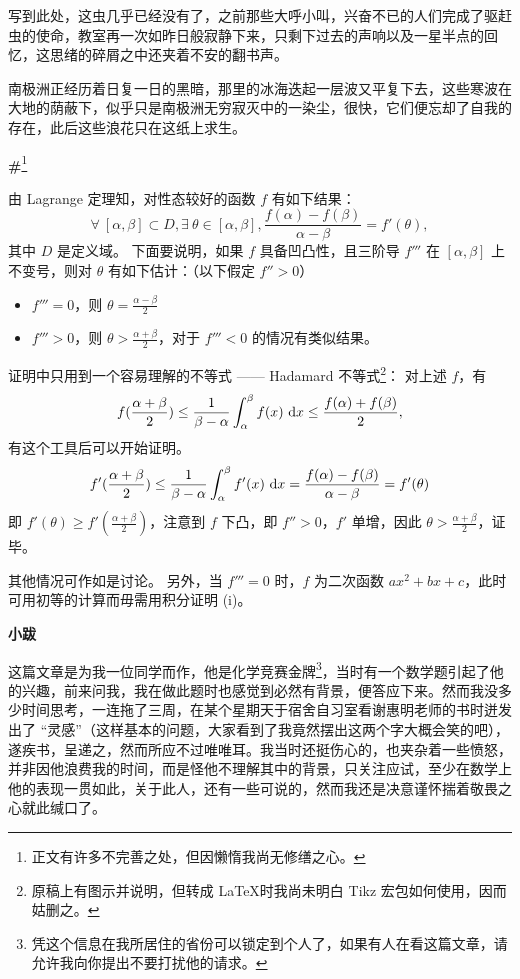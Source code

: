 \documentclass{ctexbook}
\begin{document}
    写到此处，这虫几乎已经没有了，之前那些大呼小叫，兴奋不已的人们完成了驱赶虫的使命，教室再一次如昨日般寂静下来，只剩下过去的声响以及一星半点的回忆，这思绪的碎屑之中还夹着不安的翻书声。

    南极洲正经历着日复一日的黑暗，那里的冰海迭起一层波又平复下去，这些寒波在大地的荫蔽下，似乎只是南极洲无穷寂灭中的一染尘，很快，它们便忘却了自我的存在，此后这些浪花只在这纸上求生。
    
\newpage
\textbf{\#}\footnote{\normalsize 正文有许多不完善之处，但因懒惰我尚无修缮之心。}


\mbox


    由 Lagrange 定理知，对性态较好的函数 \(f\) 有如下结果：
    \[
    \forall\ [\alpha,\beta] \subset D,\exists \ \theta \in [\alpha,\beta],\frac{f(\alpha) - f(\beta)}{\alpha - \beta} = f'(\theta),
    \]
    其中 \(D\) 是定义域。
    下面要说明，如果 \(f\) 具备凹凸性，且三阶导 \(f'''\) 在 \([\alpha,\beta]\) 上不变号，则对 \(\theta\) 有如下估计：（以下假定 \(f''>0\)）
    \begin{itemize}
        \item \(f'''=0\)，则 \(\displaystyle \theta = \frac{\alpha - \beta }{2}\)
        \item \(f''' > 0\)，则 \(\displaystyle\theta > \frac{\alpha + \beta}{2}\)，对于 \(f''' < 0\) 的情况有类似结果。
    \end{itemize}

    证明中只用到一个容易理解的不等式 —— Hadamard 不等式\footnote{\normalsize 原稿上有图示并说明，但转成 \LaTeX 时我尚未明白 Tikz 宏包如何使用，因而姑删之。}：
    对上述 \(f\)，有
    \[
    f(\frac{\alpha + \beta}{2}) \leq \frac{1}{\beta - \alpha} \int^\beta_\alpha f(x)\  {\rm d}x\leq \frac{f(\alpha)+f(\beta)}{2},
    \]
    有这个工具后可以开始证明。
    \[
    f'(\frac{\alpha + \beta}{2}) \leq \frac{1}{\beta - \alpha}\int^\beta_\alpha f'(x)\ {\rm d}x = \frac{f(\alpha) - f(\beta)}{\alpha - \beta} = f'(\theta)
    \]
    即 
    \(\displaystyle f'(\theta) \geq f'(\frac{\alpha + \beta}{2})\)，注意到 \(f\) 下凸，即 \(f''>0\)，\(f'\) 单增，因此 \(\displaystyle\theta > \frac{\alpha + \beta}{2}\)，证毕。

    其他情况可作如是讨论。
    另外，当 \(f''' = 0\) 时，\(f\) 为二次函数 \(ax^2 + bx + c\)，此时可用初等的计算而毋需用积分证明 (i)。

    
\mbox


    \textbf{\large 小跋}

    {\large 这篇文章是为我一位同学而作，他是化学竞赛金牌\footnote{\normalsize 凭这个信息在我所居住的省份可以锁定到个人了，如果有人在看这篇文章，请允许我向你提出不要打扰他的请求。}，当时有一个数学题引起了他的兴趣，前来问我，我在做此题时也感觉到必然有背景，便答应下来。然而我没多少时间思考，一连拖了三周，在某个星期天于宿舍自习室看谢惠明老师的书时迸发出了 “灵感”（这样基本的问题，大家看到了我竟然摆出这两个字大概会笑的吧），遂疾书，呈递之，然而所应不过唯唯耳。我当时还挺伤心的，也夹杂着一些愤怒，并非因他浪费我的时间，而是怪他不理解其中的背景，只关注应试，至少在数学上他的表现一贯如此，关于此人，还有一些可说的，然而我还是决意谨怀揣着敬畏之心就此缄口了。}
\end{document}
